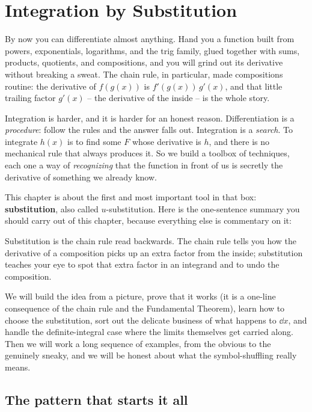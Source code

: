 \chapter{Integration by Substitution}

By now you can differentiate almost anything. Hand you a function built from
powers, exponentials, logarithms, and the trig family, glued together with sums,
products, quotients, and compositions, and you will grind out its derivative
without breaking a sweat. The chain rule, in particular, made compositions
routine: the derivative of $f(g(x))$ is $f'(g(x))\,g'(x)$, and that little
trailing factor $g'(x)$ -- the derivative of the inside -- is the whole story.

Integration is harder, and it is harder for an honest reason. Differentiation is
a \emph{procedure}: follow the rules and the answer falls out. Integration is a
\emph{search}. To integrate $h(x)$ is to find some $F$ whose derivative is $h$, and
there is no mechanical rule that always produces it. So we build a toolbox of
techniques, each one a way of \emph{recognizing} that the function in front of us
is secretly the derivative of something we already know.

This chapter is about the first and most important tool in that box:
\textbf{substitution}, also called $u$-substitution. Here is the one-sentence
summary you should carry out of this chapter, because everything else is
commentary on it:

\begin{focusbox}
Substitution is the chain rule read backwards. The chain rule tells you how the
derivative of a composition picks up an extra factor from the inside; substitution
teaches your eye to spot that extra factor in an integrand and to undo the
composition.
\end{focusbox}

We will build the idea from a picture, prove that it works (it is a one-line
consequence of the chain rule and the Fundamental Theorem), learn how to choose
the substitution, sort out the delicate business of what happens to $\dd x$, and
handle the definite-integral case where the limits themselves get carried along.
Then we will work a long sequence of examples, from the obvious to the genuinely
sneaky, and we will be honest about what the symbol-shuffling really means.

\chapterline

\section{The pattern that starts it all}
\label{ch22:the-pattern}


